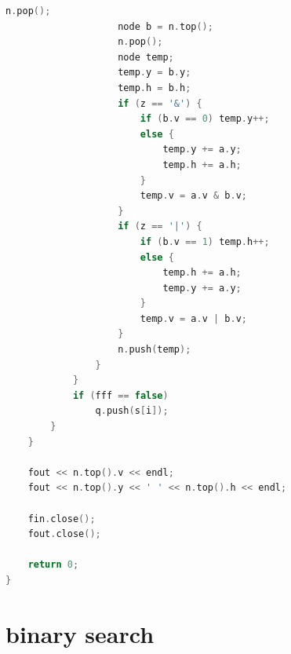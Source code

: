 \documentclass[12pt,twiside,a4paper]{ctexbook}
\numberwithin{chapter}{part}
\begin{document}
\begin{lstlisting}[language=C++]
                    n.pop();
                    node b = n.top();
                    n.pop();
                    node temp;
                    temp.y = b.y;
                    temp.h = b.h;
                    if (z == '&') {
                        if (b.v == 0) temp.y++;
                        else {
                            temp.y += a.y;
                            temp.h += a.h;
                        }
                        temp.v = a.v & b.v;
                    }
                    if (z == '|') {
                        if (b.v == 1) temp.h++;
                        else {
                            temp.h += a.h;
                            temp.y += a.y;
                        }
                        temp.v = a.v | b.v;
                    }
                    n.push(temp);
                }
            }
            if (fff == false)
                q.push(s[i]);
        }
    }
    
    fout << n.top().v << endl;
    fout << n.top().y << ' ' << n.top().h << endl;

    fin.close();
    fout.close();

    return 0;
}
\end{lstlisting}

\chapter{binary search}
\end{document}
